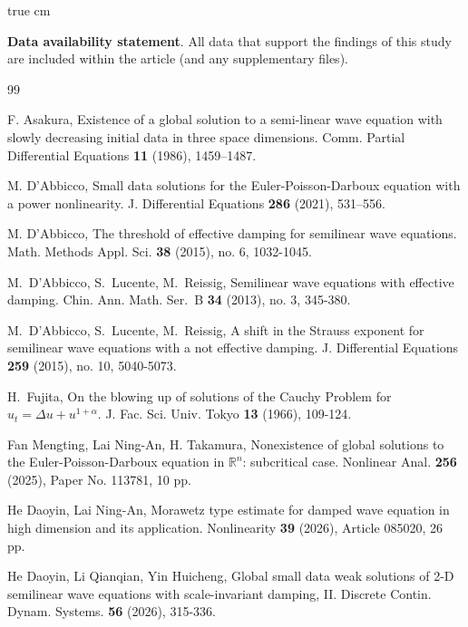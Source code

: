 \documentclass[11pt,twoside]{article}
\newcommand{\R}{\mathbb R}
\newcommand{\al}{\alpha}
\theoremstyle{plain}
\theoremstyle{definition}
\theoremstyle{remark}
\numberwithin{equation}{section}
\begin{document}
 true cm

{\bf Data availability statement}. All data that support the findings of this study
are included within the article (and any supplementary files).



\begin{thebibliography}{99}

F. Asakura,
Existence of a global solution to a semi-linear wave equation with slowly
decreasing initial data in three space dimensions.
Comm. Partial Differential Equations \textbf{11} (1986),
1459--1487.

  M. D'Abbicco, Small data solutions for the Euler-Poisson-Darboux equation with a
power nonlinearity. J. Differential Equations \textbf{286} (2021), 531--556.


M. D'Abbicco, The threshold of effective damping for semilinear wave equations.
Math. Methods Appl. Sci. \textbf{38} (2015),  no. 6, 1032-1045.

 M.~D'Abbicco, S.~Lucente, M.~Reissig,
Semilinear wave equations with effective damping.
Chin. Ann. Math. Ser.~B \textbf{34} (2013), no. 3, 345-380.



 M.~D'Abbicco, S.~Lucente, M.~Reissig, A
shift in the Strauss exponent for semilinear wave equations with a
not effective damping. J. Differential Equations \textbf{259} (2015),
no. 10, 5040-5073.



 H.~Fujita, On the blowing up of solutions of the
Cauchy Problem for $u_t=\Delta u+u^{1+\al}$.
J. Fac. Sci. Univ. Tokyo \textbf{13} (1966), 109-124.

Fan Mengting, Lai Ning-An, H. Takamura, Nonexistence of global solutions to the Euler-Poisson-Darboux equation in $\R^n$:
subcritical case. Nonlinear Anal. {\bf 256} (2025), Paper No. 113781, 10 pp.



 He Daoyin, Lai Ning-An, Morawetz type estimate for damped wave equation in high
dimension and its application. Nonlinearity {\bf 39} (2026), Article 085020, 26 pp.



 He Daoyin, Li Qianqian, Yin Huicheng,
Global small data weak solutions of 2-D semilinear wave equations
with  scale-invariant  damping, II. Discrete Contin. Dynam. Systems. {\bf 56} (2026), 315-336.




\end{thebibliography}
\end{document}
